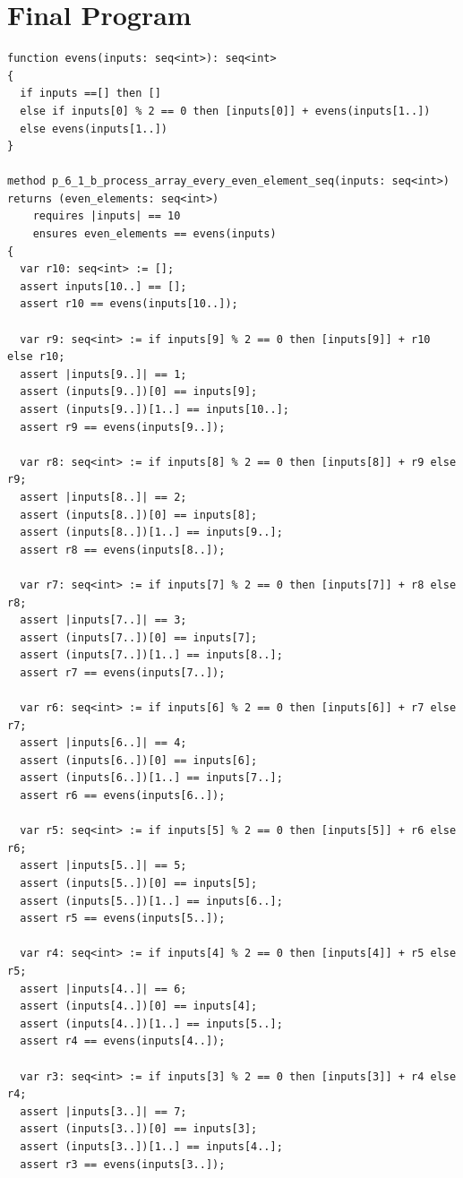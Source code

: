 \documentclass{article}
\begin{document}
\section*{Final Program}
\begin{lstlisting}
function evens(inputs: seq<int>): seq<int>
{
  if inputs ==[] then []
  else if inputs[0] % 2 == 0 then [inputs[0]] + evens(inputs[1..])
  else evens(inputs[1..])
}

method p_6_1_b_process_array_every_even_element_seq(inputs: seq<int>) returns (even_elements: seq<int>)
	requires |inputs| == 10
	ensures even_elements == evens(inputs)
{
  var r10: seq<int> := [];
  assert inputs[10..] == [];
  assert r10 == evens(inputs[10..]);

  var r9: seq<int> := if inputs[9] % 2 == 0 then [inputs[9]] + r10 else r10;
  assert |inputs[9..]| == 1;
  assert (inputs[9..])[0] == inputs[9];
  assert (inputs[9..])[1..] == inputs[10..];
  assert r9 == evens(inputs[9..]);

  var r8: seq<int> := if inputs[8] % 2 == 0 then [inputs[8]] + r9 else r9;
  assert |inputs[8..]| == 2;
  assert (inputs[8..])[0] == inputs[8];
  assert (inputs[8..])[1..] == inputs[9..];
  assert r8 == evens(inputs[8..]);

  var r7: seq<int> := if inputs[7] % 2 == 0 then [inputs[7]] + r8 else r8;
  assert |inputs[7..]| == 3;
  assert (inputs[7..])[0] == inputs[7];
  assert (inputs[7..])[1..] == inputs[8..];
  assert r7 == evens(inputs[7..]);

  var r6: seq<int> := if inputs[6] % 2 == 0 then [inputs[6]] + r7 else r7;
  assert |inputs[6..]| == 4;
  assert (inputs[6..])[0] == inputs[6];
  assert (inputs[6..])[1..] == inputs[7..];
  assert r6 == evens(inputs[6..]);

  var r5: seq<int> := if inputs[5] % 2 == 0 then [inputs[5]] + r6 else r6;
  assert |inputs[5..]| == 5;
  assert (inputs[5..])[0] == inputs[5];
  assert (inputs[5..])[1..] == inputs[6..];
  assert r5 == evens(inputs[5..]);

  var r4: seq<int> := if inputs[4] % 2 == 0 then [inputs[4]] + r5 else r5;
  assert |inputs[4..]| == 6;
  assert (inputs[4..])[0] == inputs[4];
  assert (inputs[4..])[1..] == inputs[5..];
  assert r4 == evens(inputs[4..]);

  var r3: seq<int> := if inputs[3] % 2 == 0 then [inputs[3]] + r4 else r4;
  assert |inputs[3..]| == 7;
  assert (inputs[3..])[0] == inputs[3];
  assert (inputs[3..])[1..] == inputs[4..];
  assert r3 == evens(inputs[3..]);


\end{lstlisting}
\end{document}
